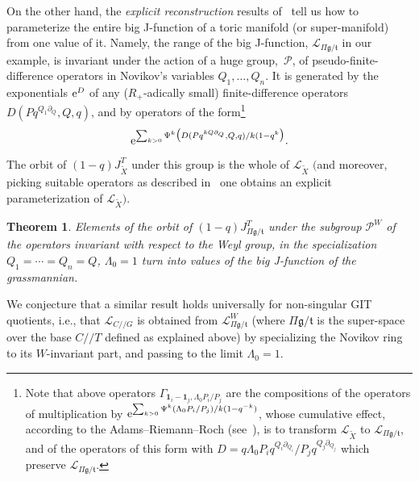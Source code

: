 \documentclass[10pt,a4paper]{amsart}
\numberwithin{equation}{section}
\newtheorem{Theorem}{Theorem}[section]
\def\L{\mathcal L}
\def\1{\mathbf 1}
\def\tilde{\widetilde}
\def\p{\partial}
\theoremstyle{definition}
\theoremstyle{plain}
\begin{document}
On the other hand, the {\em explicit reconstruction} results of~\cite{Givental:perm8} tell us how to parameterize the entire big J-function of a toric manifold (or super-manifold) from one value of it. Namely, the range of the big J-function, $\L_{\Pi \mathfrak{g}/\mathfrak{t}}$ in our example, is invariant under the action of a huge group,~${\mathcal P}$, of pseudo-finite-difference operators in Novikov's variables $Q_1,\dots,Q_n$. It is generated by the exponentials ${\rm e}^D$ of any ($R_+$-adically small) finite-difference operators $D(Pq^{Q_1\p_Q}, Q, q)$, and by operators of the form\footnote{Note that above operators $\Gamma_{\1_i-\1_j,\Lambda_0 P_i/P_j}$ are the compositions of the operators of multiplication by ${\rm e}^{\sum_{k>0}\Psi^k(\Lambda_0 P_i/P_j)/k(1-q^{-k})}$, whose cumulative effect, according to the Adams--Riemann--Roch (see~\cite{Givental:perm10}), is to transform $\L_{\tilde{X}}$ to $\L_{\Pi \mathfrak{g}/\mathfrak{t}}$, and of the operators of this form with $D= q\Lambda_0 P_iq^{Q_i\p_{Q_i}}/P_jq^{Q_j\p_{Q_j}}$ which preserve $\L_{\Pi \mathfrak{g}/\mathfrak{t}}$.}
\[
{\rm e}^{ \sum_{k>0} \Psi^k\big(D(Pq^{kQ\p_Q},Q,q)/k(1-q^k\big)}.
\]
The orbit of $(1-q) J^T_{\tilde{X}}$ under this group is the whole of $\L_{\tilde{X}}$ $\big($and moreover, picking suitable operators as described in~\cite{Givental:perm8} one obtains an explicit parameterization of $\L_{\tilde{X}}\big)$.

\begin{Theorem}\label{thm3}
Elements of the orbit of $(1-q) J^T_{\Pi \mathfrak{g}/\mathfrak{t}}$ under the subgroup ${\mathcal P}^W$ of the operators invariant with respect to the Weyl group, in the specialization $Q_1=\cdots=Q_n=Q$, $\Lambda_0=1$ turn into values of the big J-function of the grassmannian.
\end{Theorem}

We conjecture that a similar result holds universally for non-singular GIT quotients, i.e., that $\L_{C//G}$ is obtained from $\L_{\Pi \mathfrak{g}/\mathfrak{t}}^W$ (where $\Pi \mathfrak{g}/\mathfrak{t}$ is the super-space over the base $C//T$ defined as explained above) by specializing the Novikov ring to its $W$-invariant part, and passing to the limit $\Lambda_0=1$.
\end{document}
